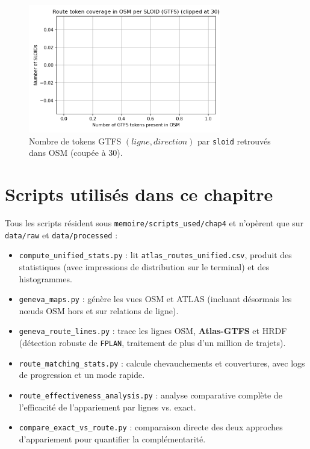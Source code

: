 \begin{figure}[H]
  \centering
  \includegraphics[width=0.75\textwidth]{../figures/chap4/hist_route_token_coverage_per_sloid.png}
  \caption{Nombre de tokens GTFS \((ligne, direction)\) par \texttt{sloid} retrouvés dans OSM (coupée à 30).}
\end{figure}

\section{Scripts utilisés dans ce chapitre}
Tous les scripts résident sous \texttt{memoire/scripts\_used/chap4} et n'opèrent que sur \texttt{data/raw} et \texttt{data/processed} :
\begin{itemize}
  \item \texttt{compute\_unified\_stats.py} : lit \texttt{atlas\_routes\_unified.csv}, produit des statistiques (avec impressions de distribution sur le terminal) et des histogrammes.
  \item \texttt{geneva\_maps.py} : génère les vues OSM et ATLAS (incluant désormais les nœuds OSM hors et sur relations de ligne).
  \item \texttt{geneva\_route\_lines.py} : trace les lignes OSM, \textbf{Atlas-GTFS} et HRDF (détection robuste de \texttt{FPLAN}, traitement de plus d'un million de trajets).
  \item \texttt{route\_matching\_stats.py} : calcule chevauchements et couvertures, avec logs de progression et un mode rapide.
  \item \texttt{route\_effectiveness\_analysis.py} : analyse comparative complète de l'efficacité de l'appariement par lignes vs. exact.
  \item \texttt{compare\_exact\_vs\_route.py} : comparaison directe des deux approches d'appariement pour quantifier la complémentarité.
\end{itemize}

